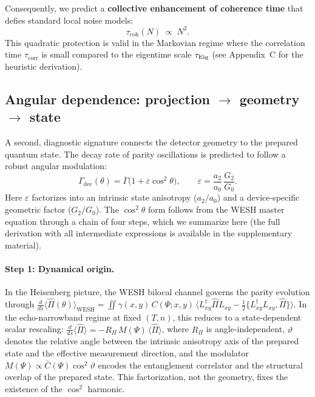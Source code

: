 \documentclass[12pt,a4paper]{article}
\numberwithin{equation}{section}
\begin{document}
Consequently, we predict a \textbf{collective enhancement of coherence time} that defies standard local noise models:
\begin{equation}
\tau_{\mathrm{coh}}(N)\;\propto\;N^2. 
\label{eq:coherence-enhancement}
\end{equation}
This quadratic protection is valid in the Markovian regime where the correlation time $\tau_{\mathrm{corr}}$ is small compared to the eigentime scale $\tau_{\rm Eig}$ (see Appendix~C for the heuristic derivation).
\vspace{0.5cm}

\subsection{Angular dependence: projection $\to$ geometry $\to$ state}
\label{subsec:ang-bridge}
\vspace{0.3cm}

A second, diagnostic signature connects the detector geometry to the prepared quantum state. The decay rate of parity oscillations is predicted to follow a robust angular modulation:
\begin{equation}
\Gamma_{\mathrm{dec}}(\theta)=\overline\Gamma\big(1+\varepsilon\cos^2\theta\big),
\qquad
\varepsilon=\frac{a_2}{a_0}\,\frac{G_2}{G_0}.
\label{eq:angular-law}
\end{equation}
Here $\varepsilon$ factorizes into an intrinsic state anisotropy ($a_2/a_0$) and a device-specific geometric factor ($G_2/G_0$). The $\cos^2\theta$ form follows from the WESH master equation through a chain of four steps, which we summarize here (the full derivation with all intermediate expressions is available in the supplementary material).

\paragraph{Step 1: Dynamical origin.}
In the Heisenberg picture, the WESH bilocal channel governs the parity evolution through $\frac{d}{ds}\langle\hat\Pi(\theta)\rangle_{\mathrm{WESH}} = \iint \gamma(x,y)\,C(\Psi;x,y)\,\langle L_{xy}^\dagger\hat\Pi L_{xy} - \tfrac{1}{2}\{L_{xy}^\dagger L_{xy},\hat\Pi\}\rangle$. In the echo-narrowband regime at fixed $(T,n)$, this reduces to a state-dependent scalar rescaling: $\frac{d}{ds}\langle\hat\Pi\rangle = -R_\Pi\,M(\Psi)\,\langle\hat\Pi\rangle$, where $R_\Pi$ is angle-independent, $\vartheta$ denotes the relative angle between the intrinsic anisotropy axis of the prepared state and the effective measurement direction, and the modulator $M(\Psi)\propto\bar{C}(\Psi)\cos^2\vartheta$ encodes the entanglement correlator and the structural overlap of the prepared state. This factorization, not the geometry, fixes the existence of the $\cos^2$ harmonic.
\end{document}
